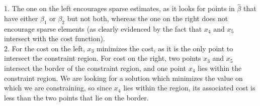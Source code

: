 \documentclass[12pt,letterpaper,boxed]{hmcpset}
\begin{document}

\begin{problem}[Problem 1]
\end{problem}

\begin{solution}
1. The one on the left encourages sparse estimates, as it looks for points in $\hat{\beta}$ that have either $\beta_1$ or $\beta_2$ but not both, whereas the one on the right does not encourage sparse elements (as clearly evidenced by the fact that $x_4$ and $x_5$  intersect with the cost function). \\
2. For the cost on the left, $x_3$ minimizes the cost, as it is the only point to intersect the constraint region. For cost on the right, two points $x_3$ and $x_5$ intersect the border of the constraint region, and one point $x_4$ lies within the constraint region. We are looking for a solution which minimizes the value on which we are constraining, so since $x_4$ lies within the region, its associated cost is less than the two points that lie on the border. \\
\end{solution}


\begin{problem}[Problem 2]

\end{problem}
\end{document}
